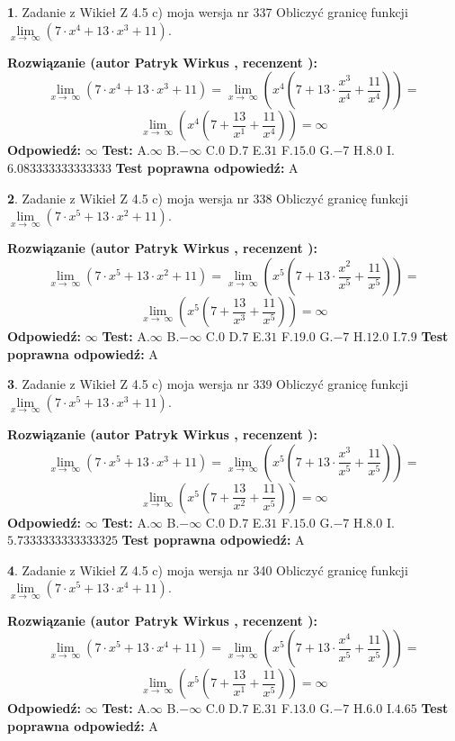 \documentclass[12pt, a4paper]{article}
\theoremstyle{definition} %
\newtheorem{zad}{}
\newcommand{\zadStart}[1]{\begin{zad}#1\newline}
\newcommand{\zadStop}{\end{zad}}
\newcommand{\rozwStart}[2]{\noindent \textbf{Rozwiązanie (autor #1 , recenzent #2): }\newline}
\newcommand{\rozwStop}{\newline}
\newcommand{\odpStart}{\noindent \textbf{Odpowiedź:}\newline}
\newcommand{\odpStop}{\newline}
\newcommand{\testStart}{\noindent \textbf{Test:}\newline}
\newcommand{\testStop}{\newline}
\newcommand{\kluczStart}{\noindent \textbf{Test poprawna odpowiedź:}\newline}
\newcommand{\kluczStop}{\newline}
\begin{document}
\zadStart{Zadanie z Wikieł Z 4.5 c) moja wersja nr 337}
Obliczyć granicę funkcji  $\lim\limits_{x\to\ \infty}(7 \cdot x^{4}+13 \cdot x^{3}+11)$.
\zadStop
\rozwStart{Patryk Wirkus}{}
$$\lim\limits_{x\to\ \infty}(7 \cdot x^{4}+13 \cdot x^{3}+11) = \lim\limits_{x\to\ \infty}(x^{4}(7 +13 \cdot \frac{x^{3}}{x^{4}}+\frac{11}{x^{4}})) =$$ $$\lim\limits_{x\to\ \infty}(x^{4}(7 +\frac{13}{x^{1}}+\frac{11}{x^{4}})) =\infty$$
\rozwStop
\odpStart
$\infty$
\odpStop
\testStart
A.$\infty$ B.$-\infty$ C.$0$ D.$7$ E.$31$
F.$15.0$ G.$-7$
H.$8.0$
I.$6.083333333333333$
\testStop
\kluczStart
A
\kluczStop



\zadStart{Zadanie z Wikieł Z 4.5 c) moja wersja nr 338}
Obliczyć granicę funkcji  $\lim\limits_{x\to\ \infty}(7 \cdot x^{5}+13 \cdot x^{2}+11)$.
\zadStop
\rozwStart{Patryk Wirkus}{}
$$\lim\limits_{x\to\ \infty}(7 \cdot x^{5}+13 \cdot x^{2}+11) = \lim\limits_{x\to\ \infty}(x^{5}(7 +13 \cdot \frac{x^{2}}{x^{5}}+\frac{11}{x^{5}})) =$$ $$\lim\limits_{x\to\ \infty}(x^{5}(7 +\frac{13}{x^{3}}+\frac{11}{x^{5}})) =\infty$$
\rozwStop
\odpStart
$\infty$
\odpStop
\testStart
A.$\infty$ B.$-\infty$ C.$0$ D.$7$ E.$31$
F.$19.0$ G.$-7$
H.$12.0$
I.$7.9$
\testStop
\kluczStart
A
\kluczStop



\zadStart{Zadanie z Wikieł Z 4.5 c) moja wersja nr 339}
Obliczyć granicę funkcji  $\lim\limits_{x\to\ \infty}(7 \cdot x^{5}+13 \cdot x^{3}+11)$.
\zadStop
\rozwStart{Patryk Wirkus}{}
$$\lim\limits_{x\to\ \infty}(7 \cdot x^{5}+13 \cdot x^{3}+11) = \lim\limits_{x\to\ \infty}(x^{5}(7 +13 \cdot \frac{x^{3}}{x^{5}}+\frac{11}{x^{5}})) =$$ $$\lim\limits_{x\to\ \infty}(x^{5}(7 +\frac{13}{x^{2}}+\frac{11}{x^{5}})) =\infty$$
\rozwStop
\odpStart
$\infty$
\odpStop
\testStart
A.$\infty$ B.$-\infty$ C.$0$ D.$7$ E.$31$
F.$15.0$ G.$-7$
H.$8.0$
I.$5.7333333333333325$
\testStop
\kluczStart
A
\kluczStop



\zadStart{Zadanie z Wikieł Z 4.5 c) moja wersja nr 340}
Obliczyć granicę funkcji  $\lim\limits_{x\to\ \infty}(7 \cdot x^{5}+13 \cdot x^{4}+11)$.
\zadStop
\rozwStart{Patryk Wirkus}{}
$$\lim\limits_{x\to\ \infty}(7 \cdot x^{5}+13 \cdot x^{4}+11) = \lim\limits_{x\to\ \infty}(x^{5}(7 +13 \cdot \frac{x^{4}}{x^{5}}+\frac{11}{x^{5}})) =$$ $$\lim\limits_{x\to\ \infty}(x^{5}(7 +\frac{13}{x^{1}}+\frac{11}{x^{5}})) =\infty$$
\rozwStop
\odpStart
$\infty$
\odpStop
\testStart
A.$\infty$ B.$-\infty$ C.$0$ D.$7$ E.$31$
F.$13.0$ G.$-7$
H.$6.0$
I.$4.65$
\testStop
\kluczStart
A
\kluczStop
\end{document}
